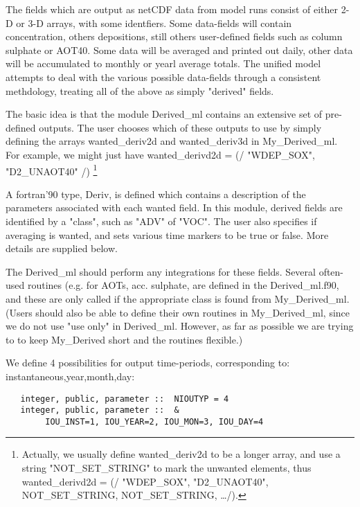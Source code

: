 \noindent
The fields which are output as netCDF data from model runs consist
of either 2-D or 3-D  arrays, with some identfiers. 
Some data-fields will contain concentration, others depositions, still
others user-defined fields such as column sulphate or AOT40.
Some data will be averaged and printed out daily, other data will
be accumulated to monthly or yearl average totals.
The unified model 
attempts to deal with the various possible data-fields through
a consistent methdology, treating all of the above as simply "derived"
fields.

The basic idea is that  the module Derived\_ml contains an extensive
set of pre-defined outputs. The user chooses which of these
outputs to use by simply defining the arrays wanted\_deriv2d
and wanted\_deriv3d in My\_Derived\_ml.  For example,
we might just have wanted\_derivd2d = (/ "WDEP\_SOX", "D2\_UNAOT40" /)
\footnote{Actually, we usually define wanted\_deriv2d to be
a longer array, and use a string "NOT\_SET\_STRING" to mark
the unwanted elements, thus wanted\_derivd2d = 
(/ "WDEP\_SOX", "D2\_UNAOT40", NOT\_SET\_STRING, NOT\_SET\_STRING, \dots /).
}




A fortran'90 type, Deriv, is defined which contains
a description of the parameters associated with each wanted field.
In this module, derived fields are identified by a "class", such as "ADV" of "VOC".
The user also specifies if averaging is wanted, and sets various
time markers to be true or false. More details are supplied below.

 The Derived\_ml should perform any integrations for these fields.
 Several often-used routines (e.g. for AOTs, acc. sulphate, are defined 
 in the Derived\_ml.f90, and these are only called if the appropriate
 class is found from My\_Derived\_ml. (Users should also be
 able to define their own routines in My\_Derived\_ml, since
 we do not use "use only" in Derived\_ml. However, as far as possible
 we are trying to to keep My\_Derived short and the routines flexible.)

  We define 4 possibilities
  for output time-periods, corresponding to: instantaneous,year,month,day:

  \begin{small}\begin{verbatim}
   integer, public, parameter ::  NIOUTYP = 4
   integer, public, parameter ::  & 
        IOU_INST=1, IOU_YEAR=2, IOU_MON=3, IOU_DAY=4
  \end{verbatim}
  \end{small}


